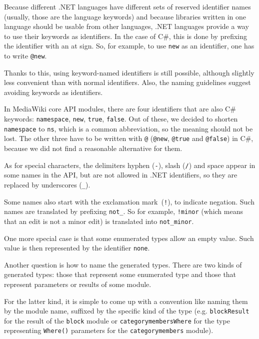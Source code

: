 \medskip

Because different .NET languages have different sets of reserved identifier names
(usually, those are the language keywords)
and because libraries written in one language should be usable from other languages,
.NET languages provide a way to use their keywords as identifiers.
In the case of C\#, this is done by prefixing the identifier with an at sign.
So, for example, to use \texttt{new} as an identifier, one has to write \lstinline{@new}.

Thanks to this, using keyword-named identifiers is still possible,
although slightly less convenient than with normal identifiers.
Also, the naming guidelines suggest avoiding keywords as identifiers.

In MediaWiki core \ac{API} modules, there are four identifiers that are also C\# keywords:
\texttt{namespace}, \texttt{new}, \texttt{true}, \texttt{false}.
Out of these, we decided to shorten \texttt{namespace} to \lstinline{ns},
which is a common abbreviation, so the meaning should not be lost.
The other three have to be written with \lstinline{@} (\lstinline{@new}, \lstinline{@true} and \lstinline{@false}) in C\#,
because we did not find a reasonable alternative for them.

\medskip

As for special characters, the delimiters hyphen (\texttt{-}), slash (\texttt{/}) and space
appear in some names in the \ac{API}, but are not allowed in .NET identifiers,
so they are replaced by underscores (\texttt{\_}).

Some names also start with the exclamation mark~(\texttt{!}), to indicate negation.
Such names are translated by prefixing \lstinline{not_}.
So for example, \texttt{!minor} (which means that an edit is not a minor edit)
is translated into \lstinline{not_minor}.

One more special case is that some enumerated types allow an empty value.
Such value is then represented by the identifier \lstinline{none}.

\medskip

Another question is how to name the generated types.
There are two kinds of generated types:
those that represent some enumerated type and those that represent parameters or results of some module.

For the latter kind, it is simple to come up with a convention like naming them by the module name,
suffixed by the specific kind of the type
(e.g. \lstinline{blockResult} for the result of the \texttt{block} module
or \lstinline{categorymembersWhere} for the type representing \lstinline{Where()} parameters for the \texttt{categorymembers} module).

